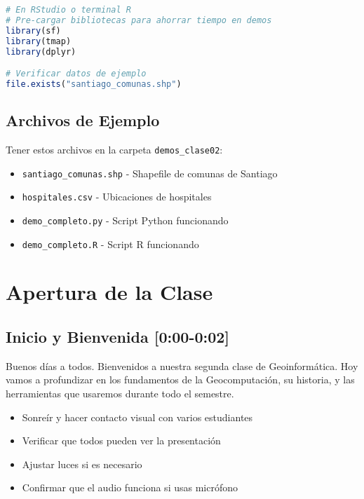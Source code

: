 \documentclass[11pt,a4paper]{article}
\newcommand{\tiempo}[1]{\textcolor{timecolor}{\faIcon{clock} \textbf{[#1]}}}
\newcommand{\decir}[1]{\begin{tcolorbox}[colback=blue!5,colframe=usachblue,title={\faIcon{microphone} DECIR}]#1\end{tcolorbox}}
\newcommand{\hacer}[1]{\begin{tcolorbox}[colback=green!5,colframe=green!50!black,title={\faIcon{hand-point-right} HACER}]#1\end{tcolorbox}}
\newcommand{\nota}[1]{\begin{tcolorbox}[colback=yellow!10,colframe=orange,title={\faIcon{sticky-note} NOTA}]#1\end{tcolorbox}}
\begin{document}
\begin{lstlisting}[language=R, title=Terminal 2: Ambiente R]
# En RStudio o terminal R
# Pre-cargar bibliotecas para ahorrar tiempo en demos
library(sf)
library(tmap)
library(dplyr)

# Verificar datos de ejemplo
file.exists("santiago_comunas.shp")
\end{lstlisting}

\subsection{Archivos de Ejemplo}

\nota{Tener estos archivos en la carpeta \texttt{demos\_clase02}:
\begin{itemize}
    \item \texttt{santiago\_comunas.shp} - Shapefile de comunas de Santiago
    \item \texttt{hospitales.csv} - Ubicaciones de hospitales
    \item \texttt{demo\_completo.py} - Script Python funcionando
    \item \texttt{demo\_completo.R} - Script R funcionando
\end{itemize}}

\newpage

\section{Apertura de la Clase}

\subsection{Inicio y Bienvenida \tiempo{0:00-0:02}}

\decir{Buenos días a todos. Bienvenidos a nuestra segunda clase de Geoinformática. Hoy vamos a profundizar en los fundamentos de la Geocomputación, su historia, y las herramientas que usaremos durante todo el semestre.}

\hacer{
\begin{itemize}
    \item Sonreír y hacer contacto visual con varios estudiantes
    \item Verificar que todos pueden ver la presentación
    \item Ajustar luces si es necesario
    \item Confirmar que el audio funciona si usas micrófono
\end{itemize}
}
\end{document}
